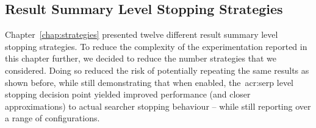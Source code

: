 

\subsection{Result Summary Level Stopping Strategies}\label{sec:serp:method:snippet}
Chapter~\ref{chap:strategies} presented twelve different result summary level stopping strategies. To reduce the complexity of the experimentation reported in this chapter further, we decided to reduce the number strategies that we considered. Doing so reduced the risk of potentially repeating the same results as shown before, while still demonstrating that when enabled, the~\gls{acr:serp} level stopping decision point yielded improved performance (and closer approximations) to actual searcher stopping behaviour -- while still reporting over a range of configurations.


